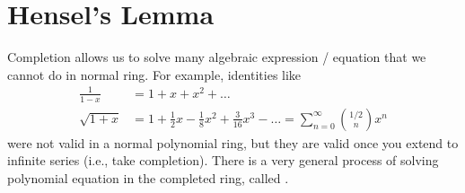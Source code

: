 \section{Hensel's Lemma}
Completion allows us to solve many algebraic expression 
/ equation that we cannot do in normal ring. 
For example, identities like
\begin{align*}
    \frac{1}{1-x} &= 1+x+x^2+\dots \\
    \sqrt{1+x} &= 1+\frac 12 x - \frac 18 x^2
    + \frac 3{16}x^3 - \dots = \sum_{n=0}^\infty \binom{1/2}n x^n
\end{align*}
were not valid in a normal polynomial ring,
but they are valid once you extend to infinite series
(i.e., take completion).
There is a very general process of solving
polynomial equation in the completed ring, called
.

